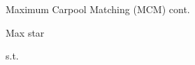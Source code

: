 \begin{frame}{Maximum Carpool Matching (MCM) cont.}
\begin{center}
\Huge
Max \3star

s.t. \faCar
{}
\end{center}
\end{frame}